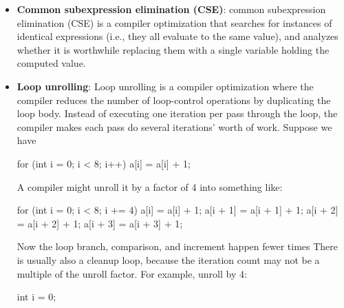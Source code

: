 \documentclass{report}
\begin{document}
\begin{itemize}
\begin{itemize}
\begin{cppcode}
                        \end{cppcode}
                        \bigbreak \noindent 
                        The first assignment is never read before being overwritten, so the first assignment is dead.
                \end{itemize}
                So dead code elimination is broader than just “removing unreachable statements.” It also includes removing useless computations and stores.
            \item \textbf{Common subexpression elimination (CSE)}: common subexpression elimination (CSE) is a compiler optimization that searches for instances of identical expressions (i.e., they all evaluate to the same value), and analyzes whether it is worthwhile replacing them with a single variable holding the computed value. 
            \item \textbf{Loop unrolling}: Loop unrolling is a compiler optimization where the compiler reduces the number of loop-control operations by duplicating the loop body.
                \bigbreak \noindent 
                Instead of executing one iteration per pass through the loop, the compiler makes each pass do several iterations’ worth of work.
                \bigbreak \noindent 
                Suppose we have
                \bigbreak \noindent 
                \begin{cppcode}
                    for (int i = 0; i < 8; i++) {
                        a[i] = a[i] + 1;
                    }
                \end{cppcode}
                \bigbreak \noindent 
                A compiler might unroll it by a factor of 4 into something like:
                \bigbreak \noindent 
                \begin{cppcode}
                    for (int i = 0; i < 8; i += 4) {
                        a[i]     = a[i] + 1;
                        a[i + 1] = a[i + 1] + 1;
                        a[i + 2] = a[i + 2] + 1;
                        a[i + 3] = a[i + 3] + 1;
                    }
                \end{cppcode}
                \bigbreak \noindent 
                Now the loop branch, comparison, and increment happen fewer times
                \bigbreak \noindent 
                There is usually also a cleanup loop, because the iteration count may not be a multiple of the unroll factor. For example, unroll by 4:
                \bigbreak \noindent 
                \begin{cppcode}
                    int i = 0;

\end{cppcode}
\end{itemize}
\end{document}
